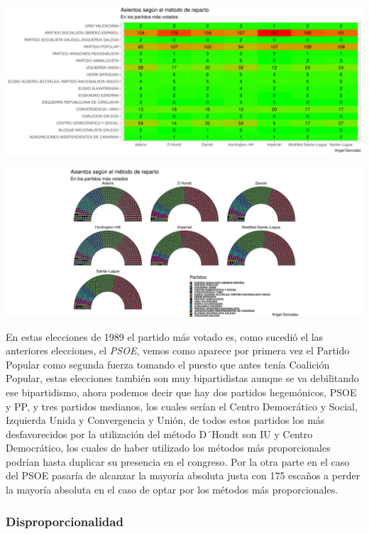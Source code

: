 \documentclass[12pt,a4paper,]{book}
\numberwithin{dummy}{section}
\theoremstyle{ocrenumbox}
\theoremstyle{blacknumex}
\theoremstyle{blacknumbox}
\theoremstyle{ocrenum}
\theoremstyle{ocrenum}
\begin{document}
\begin{center}\includegraphics[width=0.95\linewidth]{figurasR/unnamed-chunk-95-2} \end{center}

\begin{center}\includegraphics[width=0.95\linewidth]{figurasR/unnamed-chunk-95-3} \end{center}

En estas elecciones de 1989 el partido más votado es, como sucedió el
las anteriores elecciones, el \emph{PSOE}, vemos como aparece por
primera vez el Partido Popular como segunda fuerza tomando el puesto que
antes tenía Coalición Popular, estas elecciones también son muy
bipartidistas aunque se va debilitando ese bipartidismo, ahora podemos
decir que hay dos partidos hegemónicos, PSOE y PP, y tres partidos
medianos, los cuales serían el Centro Democrático y Social, Izquierda
Unida y Convergencia y Unión, de todos estos partidos los más
desfavorecidos por la utilización del método D´Hondt son IU y Centro
Democrático, los cuales de haber utilizado los métodos más
proporcionales podrían hasta duplicar su presencia en el congreso. Por
la otra parte en el caso del PSOE pasaría de alcanzar la mayoría
absoluta justa con 175 escaños a perder la mayoría absoluta en el caso
de optar por los métodos más proporcionales.

\hypertarget{disproporcionalidad-4}{%
\subsubsection{Disproporcionalidad}\label{disproporcionalidad-4}}
\end{document}
